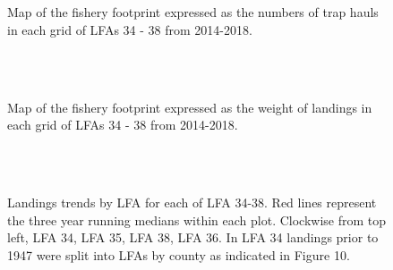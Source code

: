 \documentclass[11pt]{article}
\newcommand{\e}{/SpinDr/backup/bio_data/bio.lobster/figures/LFA3438Framework2019/} %
\begin{document}
\begin{figure}
        \centering
    \\
                \\
        
         \caption{Map of the fishery footprint expressed as the numbers of trap hauls in each grid of LFAs 34 - 38 from 2014-2018.}
        \end{figure}

\begin{figure}
        \centering
    \\
                \\
        
         \caption{Map of the fishery footprint expressed as the weight of landings in each grid of LFAs 34 - 38 from 2014-2018.}
        \end{figure}



\begin{figure}
        \centering
    \\
                \\
                
         \caption{Landings trends by LFA for each of LFA 34-38. Red lines represent the three year running medians within each plot. Clockwise from top left, LFA 34, LFA 35, LFA 38, LFA 36. In LFA 34 landings prior to 1947 were split into LFAs by county as indicated in Figure 10. }
        \end{figure}
\end{document}
